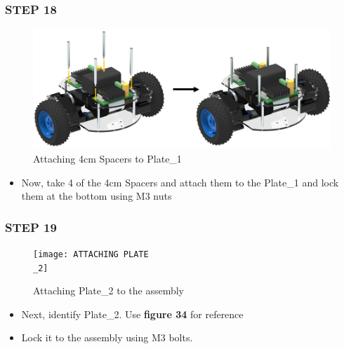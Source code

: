 \documentclass[12pt,a4paper,oneside]{book}
\begin{document}
			\subsubsection*{STEP 18}
				\begin{figure}[H]
					\begin{center}
						\includegraphics[scale=0.6]{ATTACHING 4CM SPACERS}
						\caption{Attaching 4cm Spacers to Plate\_1}
					\end{center}
				\end{figure}
				\begin{itemize}
					\item Now, take 4 of the 4cm Spacers and attach them to the Plate\_1 and lock them at the bottom using M3 nuts
				\end{itemize}
				
			\subsubsection*{STEP 19}
				\begin{figure}[H]
					\begin{center}
						\texttt{[image: ATTACHING PLATE\\\_2]}
						\caption{Attaching Plate\_2 to the assembly}
					\end{center}
				\end{figure}
				\begin{itemize}
					\item Next, identify Plate\_2. Use \textbf{figure 34} for reference 
					\item Lock it to the assembly using M3 bolts.				
				\end{itemize}
				
\end{document}
